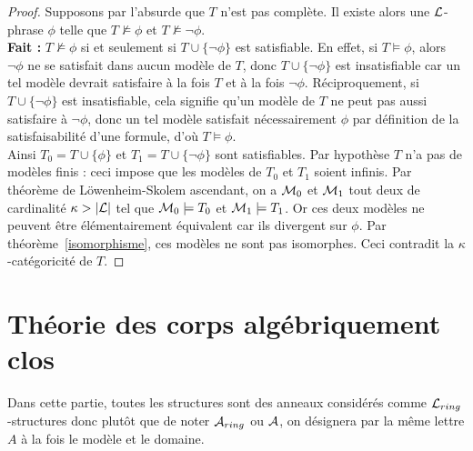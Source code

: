 \begin{proof}
Supposons par l'absurde que $T$ n'est pas complète. Il existe alors une $\mathcal{L}$-phrase $\phi$ telle que $T \not\models \phi$ et $T \not\models \neg\phi$.\\
\textbf{Fait :} $T \not\models \phi$ si et seulement si $T \cup \{\neg\phi\}$ est satisfiable. En effet, si $T \models \phi$, alors $\neg\phi$ ne se satisfait dans aucun modèle de $T$,
donc $T \cup \{\neg\phi\}$ est insatisfiable car un tel modèle devrait satisfaire à la fois $T$ et à la fois $\neg\phi$. Réciproquement, si $T \cup \{\neg\phi\}$ est insatisfiable,
cela signifie qu'un modèle de $T$ ne peut pas aussi satisfaire à $\neg\phi$, donc un tel modèle satisfait nécessairement $\phi$ par définition de la satisfaisabilité d'une formule, d'où $T \models \phi$. \\
Ainsi $T_0 = T \cup \{\phi\}$ et $T_1 = T \cup \{\neg\phi\}$ sont satisfiables.
Par hypothèse $T$ n'a pas de modèles finis : ceci impose que les modèles de $T_0$ et $T_1$ soient infinis. Par théorème de Löwenheim-Skolem ascendant, on a $\mathcal{M}_0$ et $\mathcal{M}_1$
tout deux de cardinalité $\kappa > \lvert \mathcal{L} \rvert$ tel que $\mathcal{M}_0 \models T_0$ et $\mathcal{M}_1 \models T_1$. Or ces deux modèles ne peuvent être élémentairement équivalent car ils divergent sur $\phi$.
Par théorème~\ref{isomorphisme}, ces modèles ne sont pas isomorphes. Ceci contradit la $\kappa$-catégoricité de $T$.
\end{proof}



\section{Théorie des corps algébriquement clos}

Dans cette partie, toutes les structures sont des anneaux considérés comme
$\mathcal{L}_{ring}$-structures donc plutôt que de noter $\mathcal{A}_{ring}$ ou $\mathcal{A}$, on
désignera par la même lettre $A$ à la fois le modèle et le domaine. 

